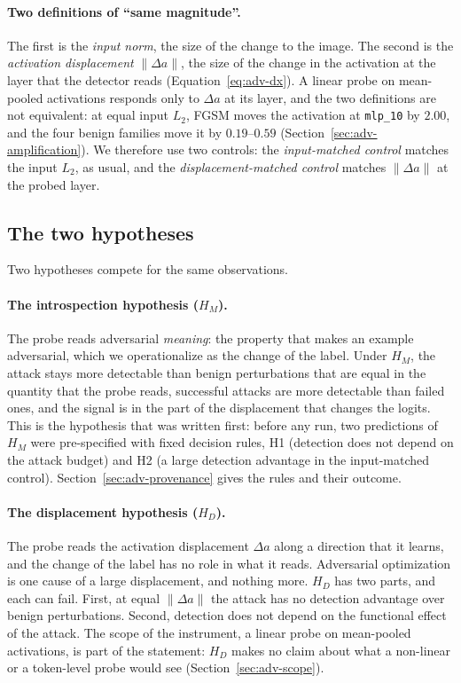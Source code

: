\documentclass[../ppgc-tese.tex]{subfiles}
\begin{document}
\paragraph*{Two definitions of ``same magnitude''.}
The first is the \emph{input norm}, the size of the change to the image. The
second is the \emph{activation displacement} $\lVert\Delta a\rVert$, the size
of the change in the activation at the layer that the detector reads
(Equation~\eqref{eq:adv-dx}). A linear probe on mean-pooled activations
responds only to $\Delta a$ at its layer, and the two definitions are not
equivalent: at equal input $L_2$, FGSM moves the activation at
\texttt{mlp\_10} by $2.00$, and the four benign families move it by
$0.19$--$0.59$ (Section~\ref{sec:adv-amplification}). We therefore use two
controls: the \emph{input-matched control} matches the input $L_2$, as usual,
and the \emph{displacement-matched control} matches $\lVert\Delta a\rVert$ at
the probed layer.

\subsection{The two hypotheses}
\label{sec:adv-two-hypotheses}

Two hypotheses compete for the same observations.

\paragraph*{The introspection hypothesis ($H_{M}$).}
The probe reads adversarial \emph{meaning}: the property that makes an example
adversarial, which we operationalize as the change of the label. Under $H_{M}$,
the attack stays more detectable than benign perturbations that are equal in
the quantity that the probe reads, successful attacks are more detectable than
failed ones, and the signal is in the part of the displacement that changes the
logits. This is the hypothesis that was written first: before any run, two
predictions of $H_{M}$ were pre-specified with fixed decision rules, H1
(detection does not depend on the attack budget) and H2 (a large detection
advantage in the input-matched control). Section~\ref{sec:adv-provenance}
gives the rules and their outcome. %

\paragraph*{The displacement hypothesis ($H_{D}$).}
The probe reads the activation displacement $\Delta a$ along a direction that
it learns, and the change of the label has no role in what it reads.
Adversarial optimization is one cause of a large displacement, and nothing
more. $H_{D}$ has two parts, and each can fail. First, at equal
$\lVert\Delta a\rVert$ the attack has no detection advantage over benign
perturbations. Second, detection does not depend on the functional effect of
the attack. The scope of the instrument, a linear probe on mean-pooled
activations, is part of the statement: $H_{D}$ makes no claim about what a
non-linear or a token-level probe would see (Section~\ref{sec:adv-scope}).
\end{document}
